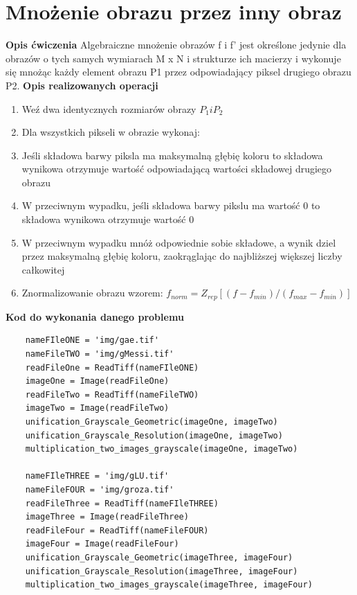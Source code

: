\documentclass[magisterska,openany]{pracadypl}
\begin{document}
\section{Mnożenie obrazu przez inny obraz}

\vspace{0.5cm}\textbf{\Large Opis ćwiczenia}
\vspace{0.25cm}\newline
Algebraiczne mnożenie obrazów f i f’ jest określone jedynie dla obrazów o tych samych wymiarach M x N i strukturze ich macierzy i wykonuje się mnożąc każdy element obrazu P1 przez odpowiadający piksel drugiego obrazu P2.
\newline
\newline
\textbf{\Large Opis realizowanych operacji}
\begin{enumerate}
\item Weź dwa identycznych rozmiarów obrazy $P_1 i P_2$
\item Dla wszystkich pikseli w obrazie wykonaj:  
\item Jeśli składowa barwy piksla ma maksymalną głębię koloru to składowa wynikowa otrzymuje wartość odpowiadającą wartości składowej drugiego obrazu
\item W przeciwnym wypadku, jeśli składowa barwy pikslu ma wartość 0 to składowa wynikowa otrzymuje wartość 0
\item W przeciwnym wypadku mnóż odpowiednie sobie składowe, a wynik dziel przez maksymalną głębię koloru, zaokrąglając do najbliższej większej liczby całkowitej
\item Znormalizowanie obrazu wzorem:
\newline $f_{norm}=Z_{rep}[(f-f_{min})/(f_{max}-f_{min})]$
\end{enumerate}

\vspace{0.5cm}
\textbf{\Large Kod do wykonania danego problemu}
\lstset{language=Python}
\vspace{0.25cm}
\begin{lstlisting}
	nameFIleONE = 'img/gae.tif'
	nameFileTWO = 'img/gMessi.tif'
	readFileOne = ReadTiff(nameFIleONE)
	imageOne = Image(readFileOne)
	readFileTwo = ReadTiff(nameFileTWO)
	imageTwo = Image(readFileTwo)
	unification_Grayscale_Geometric(imageOne, imageTwo)
	unification_Grayscale_Resolution(imageOne, imageTwo) 
	multiplication_two_images_grayscale(imageOne, imageTwo)
	
	nameFIleTHREE = 'img/gLU.tif'
	nameFileFOUR = 'img/groza.tif'
	readFileThree = ReadTiff(nameFIleTHREE)
	imageThree = Image(readFileThree)
	readFileFour = ReadTiff(nameFileFOUR)
	imageFour = Image(readFileFour)
	unification_Grayscale_Geometric(imageThree, imageFour)
	unification_Grayscale_Resolution(imageThree, imageFour)
	multiplication_two_images_grayscale(imageThree, imageFour)

\end{lstlisting}
\end{document}

